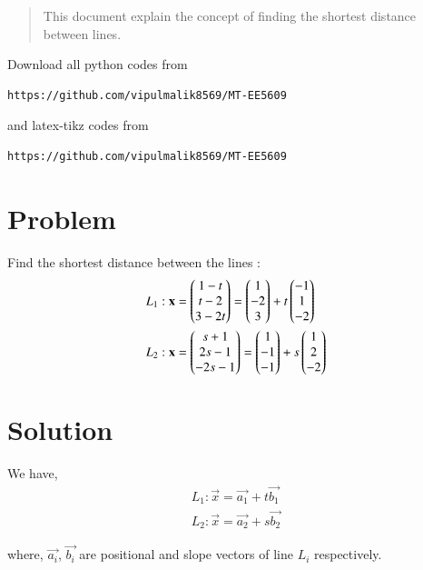 \documentclass[journal,12pt,twocolumn]{IEEEtran}
\begin{document}
\date{\today}

\maketitle
\newpage
\bigskip
\renewcommand{\thefigure}{\theenumi}
\renewcommand{\thetable}{\theenumi}

\begin{abstract}
This document explain the concept of finding the shortest distance between lines.
\end{abstract}
Download all python codes from 
\begin{lstlisting}
https://github.com/vipulmalik8569/MT-EE5609
\end{lstlisting}
and latex-tikz codes from 
\begin{lstlisting}
https://github.com/vipulmalik8569/MT-EE5609
\end{lstlisting}

\section{\textbf{Problem}}

Find the shortest distance between the lines :
\begin{align}
L_1 :\mathbf{x} &= \begin{pmatrix} 1-t \\ t-2 \\ 3-2t \end{pmatrix} = \begin{pmatrix}1\\-2\\3\end{pmatrix}+ t\begin{pmatrix}-1\\1\\-2\end{pmatrix}\\
L_2 :\mathbf{x} &= \begin{pmatrix} s+1 \\ 2s-1 \\ -2s-1 \end{pmatrix} = \begin{pmatrix}1\\-1\\-1\end{pmatrix}+ s\begin{pmatrix}1\\2\\-2\end{pmatrix} 
\end{align}

\section{\textbf{Solution}}
We have,
\begin{align}
    L_1 : \vec{x}= \vec{a_1} + t \vec{b_1}\label{eq:1}\\
    L_2 : \vec{x}= \vec{a_2} + s \vec{b_2}\label{eq:2}
\end{align}

where, $\vec{a_i}$, $\vec{b_i}$ are positional and slope vectors of line $L_i$ respectively.\\
\end{document}
